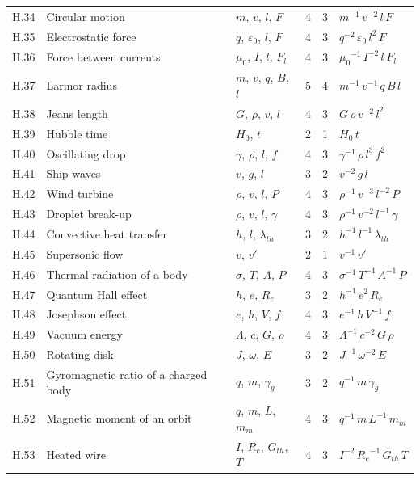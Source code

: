 {\begin{longtable}{@{}l>{\raggedright\arraybackslash}p{3.0cm}>{\raggedright\arraybackslash}p{3.6cm}rr>{\raggedright\arraybackslash}p{6.2cm}@{}}
H.34 & Circular motion & $m$, $v$, $l$, $F$ & 4 & 3 & ${m}^{-1}\,{v}^{-2}\,l\,F$ \\
H.35 & Electrostatic force & $q$, $\varepsilon_0$, $l$, $F$ & 4 & 3 & ${q}^{-2}\,\varepsilon_0\,{l}^{2}\,F$ \\
H.36 & Force between currents & $\mu_0$, $I$, $l$, $F_l$ & 4 & 3 & ${\mu_0}^{-1}\,{I}^{-2}\,l\,F_l$ \\
H.37 & Larmor radius & $m$, $v$, $q$, $B$, $l$ & 5 & 4 & ${m}^{-1}\,{v}^{-1}\,q\,B\,l$ \\
H.38 & Jeans length & $G$, $\rho$, $v$, $l$ & 4 & 3 & $G\,\rho\,{v}^{-2}\,{l}^{2}$ \\
H.39 & Hubble time & $H_0$, $t$ & 2 & 1 & $H_0\,t$ \\
H.40 & Oscillating drop & $\gamma$, $\rho$, $l$, $f$ & 4 & 3 & ${\gamma}^{-1}\,\rho\,{l}^{3}\,{f}^{2}$ \\
H.41 & Ship waves & $v$, $g$, $l$ & 3 & 2 & ${v}^{-2}\,g\,l$ \\
H.42 & Wind turbine & $\rho$, $v$, $l$, $P$ & 4 & 3 & ${\rho}^{-1}\,{v}^{-3}\,{l}^{-2}\,P$ \\
H.43 & Droplet break-up & $\rho$, $v$, $l$, $\gamma$ & 4 & 3 & ${\rho}^{-1}\,{v}^{-2}\,{l}^{-1}\,\gamma$ \\
H.44 & Convective heat transfer & $h$, $l$, $\lambda_{th}$ & 3 & 2 & ${h}^{-1}\,{l}^{-1}\,\lambda_{th}$ \\
H.45 & Supersonic flow & $v$, $v'$ & 2 & 1 & ${v}^{-1}\,v'$ \\
H.46 & Thermal radiation of a body & $\sigma$, $T$, $A$, $P$ & 4 & 3 & ${\sigma}^{-1}\,{T}^{-4}\,{A}^{-1}\,P$ \\
H.47 & Quantum Hall effect & $h$, $e$, $R_e$ & 3 & 2 & ${h}^{-1}\,{e}^{2}\,R_e$ \\
H.48 & Josephson effect & $e$, $h$, $V$, $f$ & 4 & 3 & ${e}^{-1}\,h\,{V}^{-1}\,f$ \\
H.49 & Vacuum energy & $\Lambda$, $c$, $G$, $\rho$ & 4 & 3 & ${\Lambda}^{-1}\,{c}^{-2}\,G\,\rho$ \\
H.50 & Rotating disk & $J$, $\omega$, $E$ & 3 & 2 & ${J}^{-1}\,{\omega}^{-2}\,E$ \\
H.51 & Gyromagnetic ratio of a charged body & $q$, $m$, $\gamma_g$ & 3 & 2 & ${q}^{-1}\,m\,\gamma_g$ \\
H.52 & Magnetic moment of an orbit & $q$, $m$, $L$, $m_m$ & 4 & 3 & ${q}^{-1}\,m\,{L}^{-1}\,m_m$ \\
H.53 & Heated wire & $I$, $R_e$, $G_{th}$, $T$ & 4 & 3 & ${I}^{-2}\,{R_e}^{-1}\,G_{th}\,T$ \\

\end{longtable}}
